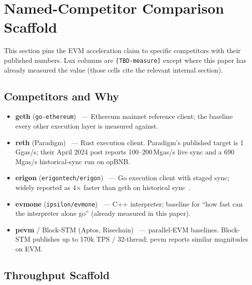\section{Named-Competitor Comparison Scaffold}
\label{sec:evmgpu-named-comp}

This section pins the EVM acceleration claim to specific competitors with
their published numbers. Lux columns are \texttt{[TBD-measure]} except
where this paper has already measured the value (those cells cite the
relevant internal section).

\subsection{Competitors and Why}

\begin{itemize}
  \item \textbf{geth} (\texttt{go-ethereum})~\cite{gethgithub} ---
        Ethereum mainnet reference client; the baseline every other
        execution layer is measured against.
  \item \textbf{reth} (Paradigm)~\cite{rethgithub,paradigmreth2024} ---
        Rust execution client. Paradigm's published target is 1\,Ggas/s;
        their April 2024 post reports 100--200\,Mgas/s live sync and
        a 690\,Mgas/s historical-sync run on opBNB.
  \item \textbf{erigon} (\texttt{erigontech/erigon})~\cite{erigongithub}
        --- Go execution client with staged sync; widely reported as
        4$\times$ faster than geth on historical sync~\cite{chainstackgetherigon}.
  \item \textbf{evmone} (\texttt{ipsilon/evmone})~\cite{evmonegithub} ---
        C++ interpreter; baseline for ``how fast can the interpreter
        alone go'' (already measured in this paper).
  \item \textbf{pevm} / Block-STM (Aptos, Risechain)~\cite{blockstmppopp,pevmrise}
        --- parallel-EVM baselines. Block-STM publishes up to 170k
        TPS / 32-thread; pevm reports similar magnitudes on EVM.
\end{itemize}

\subsection{Throughput Scaffold}

